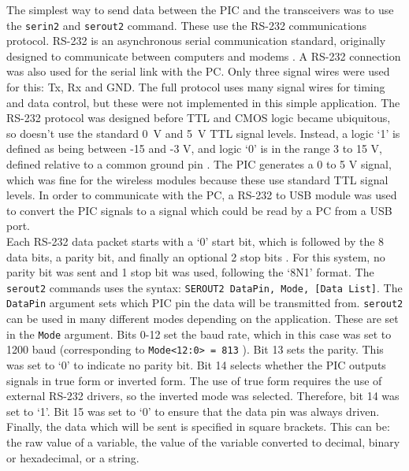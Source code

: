 The simplest way to send data between the PIC and the transceivers was to use the \verb|serin2| and \verb|serout2| command. These use the RS-232 communications protocol. RS-232 is an asynchronous serial communication standard, originally designed to communicate between computers and modems \cite{rs232}. A RS-232 connection was also used for the serial link with the PC. Only three signal wires were used for this: Tx, Rx and GND. The full protocol uses many signal wires for timing and data control, but these were not implemented in this simple application. The RS-232 protocol was designed before TTL and CMOS logic became ubiquitous, so doesn't use the standard \SI{0}{\volt} and \SI{5}{\volt} TTL signal levels. Instead, a logic `1' is defined as being between -15 and -3 V, and logic `0' is in the range 3 to 15 V, defined relative to a common ground pin \cite{rs232}. The PIC generates a 0 to 5 V signal, which was fine for the wireless modules because these use standard TTL signal levels. In order to communicate with the PC, a RS-232 to USB module was used to convert the PIC signals to a signal which could be read by a PC from a USB port.\\

Each RS-232 data packet starts with a `0' start bit, which is followed by the 8 data bits, a parity bit, and finally an optional 2 stop bits \cite{rs232}. For this system, no parity bit was sent and 1 stop bit was used, following the `8N1' format. The \verb|serout2| commands uses the syntax:
\verb|SEROUT2 DataPin, Mode, [Data List]|. The \verb|DataPin| argument sets which PIC pin the data will be transmitted from. \verb|serout2| can be used in many different modes depending on the application. These are set in the \verb|Mode| argument. Bits 0-12 set the baud rate, which in this case was set to 1200 baud (corresponding to \verb|Mode<12:0> = 813| \cite{picbasic_pro}). Bit 13 sets the parity. This was set to `0' to indicate no parity bit. Bit 14 selects whether the PIC outputs signals in true form or inverted form. The use of true form requires the use of external RS-232 drivers, so the inverted mode was selected. Therefore, bit 14 was set to `1'. Bit 15 was set to `0' to ensure that the data pin was always driven. Finally, the data which will be sent is specified in square brackets. This can be: the raw value of a variable, the value of the variable converted to decimal, binary or hexadecimal, or a string.\\

